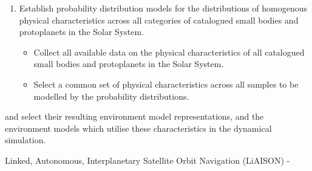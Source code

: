 \begin{enumerate}
    \item Establish probability distribution models for the distributions of homogenous physical characteristics across all categories of catalogued small bodies and protoplanets in the Solar System.
    \begin{itemize}
        \item Collect all available data on the physical characteristics of all catalogued small bodies and protoplanets in the Solar System.
        \item Select a common set of physical characteristics across all samples to be modelled by the probability distributions.
    \end{itemize}
\end{enumerate}


and select their resulting environment model representations,
and the environment models which utilise these characteristics in the dynamical simulation.

\begin{itemize}

\end{itemize}


Linked, Autonomous, Interplanetary Satellite Orbit Navigation (LiAISON) - \cite{Hill2006}